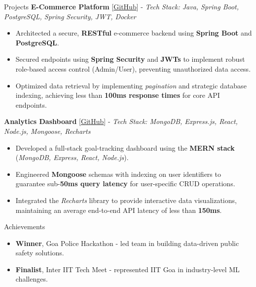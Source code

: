 \documentclass{resume}
\begin{document}
\begin{rSection}{Projects}
\textbf{E-Commerce Platform} [\href{https://github.com/rujuldwivedi/Full-Stack-eCommerce-App}{GitHub}] -
\textit{Tech Stack: Java, Spring Boot, PostgreSQL, Spring Security, JWT, Docker}
\vspace{-6pt}
\begin{itemize}
    \itemsep -6pt
    \item Architected a secure, \textbf{RESTful} e-commerce backend using \textbf{Spring Boot} and \textbf{PostgreSQL}.
    \item Secured endpoints using \textbf{Spring Security} and \textbf{JWTs} to implement robust role-based access control (Admin/User), preventing unauthorized data access.
    \item Optimized data retrieval by implementing \textit{pagination} and strategic database indexing, achieving less than \textbf{100ms response times} for core API endpoints.
\end{itemize}
\textbf{Analytics Dashboard} [\href{https://github.com/rujuldwivedi/Dashboard}{GitHub}] -
\textit{Tech Stack: MongoDB, Express.js, React, Node.js, Mongoose, Recharts}
\vspace{-6pt}
\begin{itemize}
    \itemsep -6pt
    \item Developed a full-stack goal-tracking dashboard using the \textbf{MERN stack} (\textit{MongoDB, Express, React, Node.js}).
    \item Engineered \textbf{Mongoose} schemas with indexing on user identifiers to guarantee sub-\textbf{50ms query latency} for user-specific CRUD operations.
    \item Integrated the \textit{Recharts} library to provide interactive data visualizations, maintaining an average end-to-end API latency of less than \textbf{150ms}.
\end{itemize}
\end{rSection}
\vspace{-6pt}
\begin{rSection}{Achievements}
\begin{itemize}
\itemsep -6pt
\item \textbf{Winner}, Goa Police Hackathon - led team in building data-driven public safety solutions.
\item \textbf{Finalist}, Inter IIT Tech Meet - represented IIT Goa in industry-level ML challenges.
\end{itemize}
\end{rSection}
\end{document}
